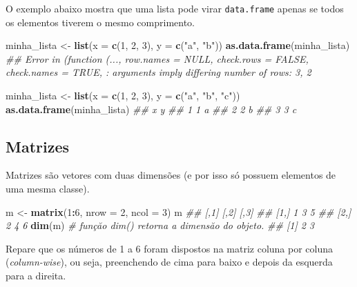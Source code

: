 \documentclass[
]{book}
\newenvironment{Shaded}{\begin{snugshade}}{\end{snugshade}}
\newcommand{\CommentTok}[1]{\textcolor[rgb]{0.56,0.35,0.01}{\textit{#1}}}
\newcommand{\DataTypeTok}[1]{\textcolor[rgb]{0.13,0.29,0.53}{#1}}
\newcommand{\DecValTok}[1]{\textcolor[rgb]{0.00,0.00,0.81}{#1}}
\newcommand{\KeywordTok}[1]{\textcolor[rgb]{0.13,0.29,0.53}{\textbf{#1}}}
\newcommand{\NormalTok}[1]{#1}
\newcommand{\OperatorTok}[1]{\textcolor[rgb]{0.81,0.36,0.00}{\textbf{#1}}}
\newcommand{\StringTok}[1]{\textcolor[rgb]{0.31,0.60,0.02}{#1}}
\begin{document}
O exemplo abaixo mostra que uma lista pode virar \texttt{data.frame} apenas se todos os elementos tiverem o mesmo comprimento.

\begin{Shaded}
\begin{Highlighting}[]
\NormalTok{minha_lista <-}\StringTok{ }\KeywordTok{list}\NormalTok{(}\DataTypeTok{x =} \KeywordTok{c}\NormalTok{(}\DecValTok{1}\NormalTok{, }\DecValTok{2}\NormalTok{, }\DecValTok{3}\NormalTok{), }\DataTypeTok{y =} \KeywordTok{c}\NormalTok{(}\StringTok{"a"}\NormalTok{, }\StringTok{"b"}\NormalTok{))}
\KeywordTok{as.data.frame}\NormalTok{(minha_lista)}
\CommentTok{## Error in (function (..., row.names = NULL, check.rows = FALSE, check.names = TRUE, : arguments imply differing number of rows: 3, 2}

\NormalTok{minha_lista <-}\StringTok{ }\KeywordTok{list}\NormalTok{(}\DataTypeTok{x =} \KeywordTok{c}\NormalTok{(}\DecValTok{1}\NormalTok{, }\DecValTok{2}\NormalTok{, }\DecValTok{3}\NormalTok{), }\DataTypeTok{y =} \KeywordTok{c}\NormalTok{(}\StringTok{"a"}\NormalTok{, }\StringTok{"b"}\NormalTok{, }\StringTok{"c"}\NormalTok{))}
\KeywordTok{as.data.frame}\NormalTok{(minha_lista)}
\CommentTok{##   x y}
\CommentTok{## 1 1 a}
\CommentTok{## 2 2 b}
\CommentTok{## 3 3 c}
\end{Highlighting}
\end{Shaded}

\hypertarget{matrizes}{%
\subsection{Matrizes}\label{matrizes}}

Matrizes são vetores com duas dimensões (e por isso só possuem elementos de uma mesma classe).

\begin{Shaded}
\begin{Highlighting}[]
\NormalTok{m <-}\StringTok{ }\KeywordTok{matrix}\NormalTok{(}\DecValTok{1}\OperatorTok{:}\DecValTok{6}\NormalTok{, }\DataTypeTok{nrow =} \DecValTok{2}\NormalTok{, }\DataTypeTok{ncol =} \DecValTok{3}\NormalTok{)}
\NormalTok{m}
\CommentTok{##      [,1] [,2] [,3]}
\CommentTok{## [1,]    1    3    5}
\CommentTok{## [2,]    2    4    6}
\KeywordTok{dim}\NormalTok{(m) }\CommentTok{# funçăo dim() retorna a dimensăo do objeto.}
\CommentTok{## [1] 2 3}
\end{Highlighting}
\end{Shaded}

Repare que os números de 1 a 6 foram dispostos na matriz coluna por coluna (\emph{column-wise}), ou seja, preenchendo de cima para baixo e depois da esquerda para a direita.
\end{document}
